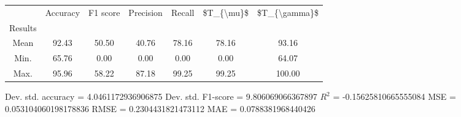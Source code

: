 \begin{tabular}{|c|c|c|c|c|c|c|}
\toprule
{} &  Accuracy &  F1 score &  Precision &  Recall &  \$T\_\{\textbackslash mu\}\$ &  \$T\_\{\textbackslash gamma\}\$ \\
Results &           &           &            &         &            &               \\
\hline
Mean    &     92.43 &     50.50 &      40.76 &   78.16 &      78.16 &         93.16 \\
Min.    &     65.76 &      0.00 &       0.00 &    0.00 &       0.00 &         64.07 \\
Max.    &     95.96 &     58.22 &      87.18 &   99.25 &      99.25 &        100.00 \\
\bottomrule
\end{tabular}

 Dev. std. accuracy = 4.0461172936906875
 Dev. std. F1-score = 9.806069066367897
 $R^2$ = -0.15625810665555084
 MSE = 0.053104060198178836
 RMSE = 0.2304431821473112
 MAE = 0.0788381968440426